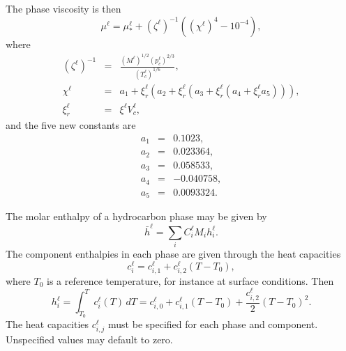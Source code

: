 The phase viscosity is then
\begin{equation}
  \mu^\ell = \mu_*^\ell + \left(\zeta^\ell\right)^{-1}
  \left( (\chi^\ell)^4 - 10^{-4} \right),
\end{equation}
where
\begin{eqnarray}
  \left(\zeta^\ell\right)^{-1} & = &
  \frac{\left(M^\ell\right)^{1/2} \left(p_c^\ell\right)^{2/3}}
  {\left(T_c^\ell\right)^{1/6}}, \\
  \chi^\ell & = &
  a_1 + \xi_r^\ell \left(
    a_2 + \xi_r^\ell \left(
      a_3 + \xi_r^\ell \left(
        a_4 + \xi_r^\ell a_5 \right)
    \right)
  \right), \\
  \xi_r^\ell & = & \xi^\ell V_c^\ell,
\end{eqnarray}
and the five new constants are
\begin{eqnarray}
  a_1 & = & 0.1023, \\
  a_2 & = & 0.023364, \\
  a_3 & = & 0.058533, \\
  a_4 & = & -0.040758, \\
  a_5 & = & 0.0093324.
\end{eqnarray}



The molar enthalpy of a hydrocarbon phase may be given by
\begin{equation}
  \bar h^\ell = \sum_i C_i^\ell M_i h_i^\ell.
\end{equation}
The component enthalpies in each phase are given through the heat
capacities
\begin{equation}
  c_i^\ell = c_{i,1}^\ell + c_{i,2}^\ell (T-T_0),
\end{equation}
where $T_0$ is a reference temperature, for instance at surface
conditions. Then
\begin{equation}
  h_i^\ell = \int_{T_0}^T c_i^\ell(T)\, dT =
  c_{i,0}^\ell + c_{i,1}^\ell (T-T_0) +
  \frac{c_{i,2}^\ell}{2} (T-T_0)^2.
\end{equation}
The heat capacities $c_{i,j}^\ell$ must be specified for each phase
and component. Unspecified values may default to zero.

